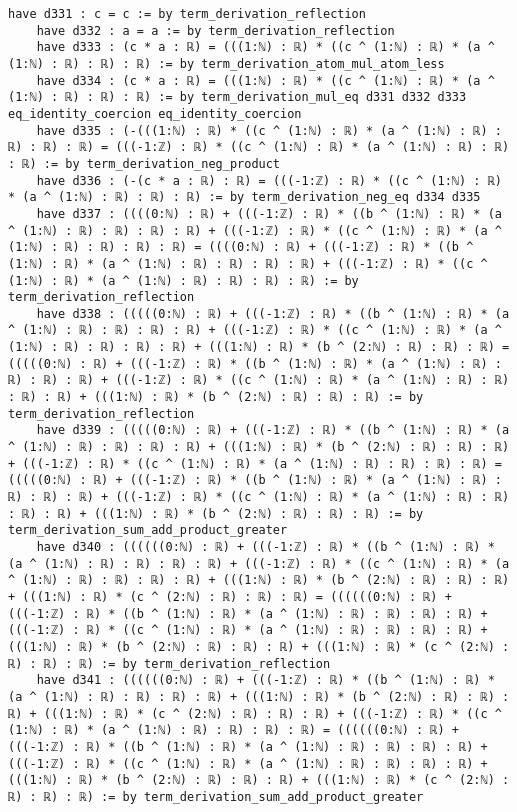 \documentclass{article}
\begin{document}
\begin{tcolorbox}[colback=white!10, width=\linewidth]
\begin{lstlisting}[language=Lean4]
    have d331 : c = c := by term_derivation_reflection
    have d332 : a = a := by term_derivation_reflection
    have d333 : (c * a : ℝ) = (((1:ℕ) : ℝ) * ((c ^ (1:ℕ) : ℝ) * (a ^ (1:ℕ) : ℝ) : ℝ) : ℝ) := by term_derivation_atom_mul_atom_less
    have d334 : (c * a : ℝ) = (((1:ℕ) : ℝ) * ((c ^ (1:ℕ) : ℝ) * (a ^ (1:ℕ) : ℝ) : ℝ) : ℝ) := by term_derivation_mul_eq d331 d332 d333 eq_identity_coercion eq_identity_coercion
    have d335 : (-(((1:ℕ) : ℝ) * ((c ^ (1:ℕ) : ℝ) * (a ^ (1:ℕ) : ℝ) : ℝ) : ℝ) : ℝ) = (((-1:ℤ) : ℝ) * ((c ^ (1:ℕ) : ℝ) * (a ^ (1:ℕ) : ℝ) : ℝ) : ℝ) := by term_derivation_neg_product
    have d336 : (-(c * a : ℝ) : ℝ) = (((-1:ℤ) : ℝ) * ((c ^ (1:ℕ) : ℝ) * (a ^ (1:ℕ) : ℝ) : ℝ) : ℝ) := by term_derivation_neg_eq d334 d335
    have d337 : ((((0:ℕ) : ℝ) + (((-1:ℤ) : ℝ) * ((b ^ (1:ℕ) : ℝ) * (a ^ (1:ℕ) : ℝ) : ℝ) : ℝ) : ℝ) + (((-1:ℤ) : ℝ) * ((c ^ (1:ℕ) : ℝ) * (a ^ (1:ℕ) : ℝ) : ℝ) : ℝ) : ℝ) = ((((0:ℕ) : ℝ) + (((-1:ℤ) : ℝ) * ((b ^ (1:ℕ) : ℝ) * (a ^ (1:ℕ) : ℝ) : ℝ) : ℝ) : ℝ) + (((-1:ℤ) : ℝ) * ((c ^ (1:ℕ) : ℝ) * (a ^ (1:ℕ) : ℝ) : ℝ) : ℝ) : ℝ) := by term_derivation_reflection
    have d338 : (((((0:ℕ) : ℝ) + (((-1:ℤ) : ℝ) * ((b ^ (1:ℕ) : ℝ) * (a ^ (1:ℕ) : ℝ) : ℝ) : ℝ) : ℝ) + (((-1:ℤ) : ℝ) * ((c ^ (1:ℕ) : ℝ) * (a ^ (1:ℕ) : ℝ) : ℝ) : ℝ) : ℝ) + (((1:ℕ) : ℝ) * (b ^ (2:ℕ) : ℝ) : ℝ) : ℝ) = (((((0:ℕ) : ℝ) + (((-1:ℤ) : ℝ) * ((b ^ (1:ℕ) : ℝ) * (a ^ (1:ℕ) : ℝ) : ℝ) : ℝ) : ℝ) + (((-1:ℤ) : ℝ) * ((c ^ (1:ℕ) : ℝ) * (a ^ (1:ℕ) : ℝ) : ℝ) : ℝ) : ℝ) + (((1:ℕ) : ℝ) * (b ^ (2:ℕ) : ℝ) : ℝ) : ℝ) := by term_derivation_reflection
    have d339 : (((((0:ℕ) : ℝ) + (((-1:ℤ) : ℝ) * ((b ^ (1:ℕ) : ℝ) * (a ^ (1:ℕ) : ℝ) : ℝ) : ℝ) : ℝ) + (((1:ℕ) : ℝ) * (b ^ (2:ℕ) : ℝ) : ℝ) : ℝ) + (((-1:ℤ) : ℝ) * ((c ^ (1:ℕ) : ℝ) * (a ^ (1:ℕ) : ℝ) : ℝ) : ℝ) : ℝ) = (((((0:ℕ) : ℝ) + (((-1:ℤ) : ℝ) * ((b ^ (1:ℕ) : ℝ) * (a ^ (1:ℕ) : ℝ) : ℝ) : ℝ) : ℝ) + (((-1:ℤ) : ℝ) * ((c ^ (1:ℕ) : ℝ) * (a ^ (1:ℕ) : ℝ) : ℝ) : ℝ) : ℝ) + (((1:ℕ) : ℝ) * (b ^ (2:ℕ) : ℝ) : ℝ) : ℝ) := by term_derivation_sum_add_product_greater
    have d340 : ((((((0:ℕ) : ℝ) + (((-1:ℤ) : ℝ) * ((b ^ (1:ℕ) : ℝ) * (a ^ (1:ℕ) : ℝ) : ℝ) : ℝ) : ℝ) + (((-1:ℤ) : ℝ) * ((c ^ (1:ℕ) : ℝ) * (a ^ (1:ℕ) : ℝ) : ℝ) : ℝ) : ℝ) + (((1:ℕ) : ℝ) * (b ^ (2:ℕ) : ℝ) : ℝ) : ℝ) + (((1:ℕ) : ℝ) * (c ^ (2:ℕ) : ℝ) : ℝ) : ℝ) = ((((((0:ℕ) : ℝ) + (((-1:ℤ) : ℝ) * ((b ^ (1:ℕ) : ℝ) * (a ^ (1:ℕ) : ℝ) : ℝ) : ℝ) : ℝ) + (((-1:ℤ) : ℝ) * ((c ^ (1:ℕ) : ℝ) * (a ^ (1:ℕ) : ℝ) : ℝ) : ℝ) : ℝ) + (((1:ℕ) : ℝ) * (b ^ (2:ℕ) : ℝ) : ℝ) : ℝ) + (((1:ℕ) : ℝ) * (c ^ (2:ℕ) : ℝ) : ℝ) : ℝ) := by term_derivation_reflection
    have d341 : ((((((0:ℕ) : ℝ) + (((-1:ℤ) : ℝ) * ((b ^ (1:ℕ) : ℝ) * (a ^ (1:ℕ) : ℝ) : ℝ) : ℝ) : ℝ) + (((1:ℕ) : ℝ) * (b ^ (2:ℕ) : ℝ) : ℝ) : ℝ) + (((1:ℕ) : ℝ) * (c ^ (2:ℕ) : ℝ) : ℝ) : ℝ) + (((-1:ℤ) : ℝ) * ((c ^ (1:ℕ) : ℝ) * (a ^ (1:ℕ) : ℝ) : ℝ) : ℝ) : ℝ) = ((((((0:ℕ) : ℝ) + (((-1:ℤ) : ℝ) * ((b ^ (1:ℕ) : ℝ) * (a ^ (1:ℕ) : ℝ) : ℝ) : ℝ) : ℝ) + (((-1:ℤ) : ℝ) * ((c ^ (1:ℕ) : ℝ) * (a ^ (1:ℕ) : ℝ) : ℝ) : ℝ) : ℝ) + (((1:ℕ) : ℝ) * (b ^ (2:ℕ) : ℝ) : ℝ) : ℝ) + (((1:ℕ) : ℝ) * (c ^ (2:ℕ) : ℝ) : ℝ) : ℝ) := by term_derivation_sum_add_product_greater

\end{lstlisting}
\end{tcolorbox}
\end{document}

